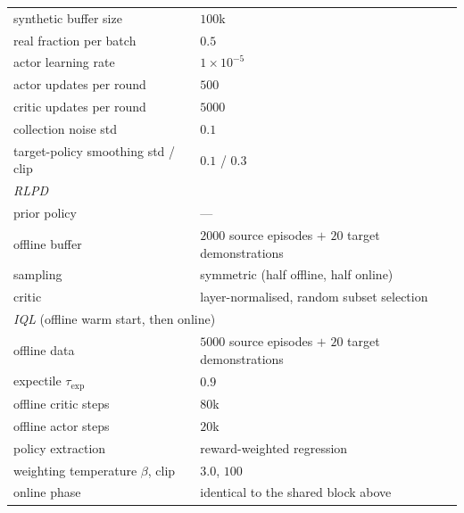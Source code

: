 \begin{table}[h]
\begin{tabular}{ll}
synthetic buffer size             & $100$k \\
real fraction per batch           & $0.5$ \\
actor learning rate               & $1{\times}10^{-5}$ \\
actor updates per round           & $500$ \\
critic updates per round          & $5000$ \\
collection noise std              & $0.1$ \\
target-policy smoothing std / clip & $0.1$ / $0.3$ \\
\midrule
\multicolumn{2}{l}{\emph{RLPD}} \\
\midrule
prior policy                      & --- \\
offline buffer                    & $2000$ source episodes $+$ $20$ target demonstrations \\
sampling                          & symmetric (half offline, half online) \\
critic                            & layer-normalised, random subset selection \\
\midrule
\multicolumn{2}{l}{\emph{IQL} (offline warm start, then online)} \\
\midrule
offline data                      & $5000$ source episodes $+$ $20$ target demonstrations \\
expectile $\tau_{\text{exp}}$     & $0.9$ \\
offline critic steps              & $80$k \\
offline actor steps               & $20$k \\
policy extraction                 & reward-weighted regression \\
weighting temperature $\beta$, clip & $3.0$, $100$ \\
online phase                      & identical to the shared block above \\
\bottomrule
\end{tabular}
\end{table}

